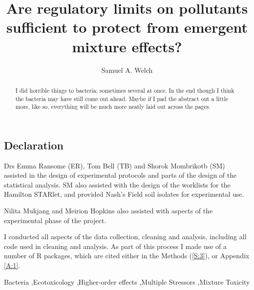 \documentclass[final,1p,times]{elsarticle}
\begin{document}
\begin{frontmatter}


\section{Declaration}

Drs Emma Ransome (ER), Tom Bell (TB) and Shorok Mombrikotb (SM) assisted in the design of experimental protocols and parts of the design of the statistical analysis. SM also assisted with the design of the worklists for the Hamilton STARlet, and provided Nash's Field soil isolates for experimental use.

Nilita Mukjang and Meirion Hopkins also assisted with aspects of the experimental phase of the project.

I conducted all aspects of the data collection, cleaning and analysis, including all code used in cleaning and analysis. As part of this process I made use of a number of R packages, which are cited either in the Methods (\cref{S:3}), or Appendix \ref{A:1}. 
\newpage

\title{Are regulatory limits on pollutants sufficient to protect from emergent mixture effects?}


\author{Samuel A. Welch}

\address{Silwood Park, Imperial College London, United Kingdom}

\begin{abstract}
I did horrible things to bacteria; sometimes several at once. In the end though I think the bacteria may have still come out ahead. Maybe if I pad the abstract out a little more, like so, everything will be much more neatly laid out across the pages. 
\end{abstract}

\begin{keyword}
Bacteria \sep Ecotoxicology \sep Higher-order effects \sep Multiple Stressors \sep Mixture Toxicity


\end{keyword}

\end{frontmatter}
\end{document}
